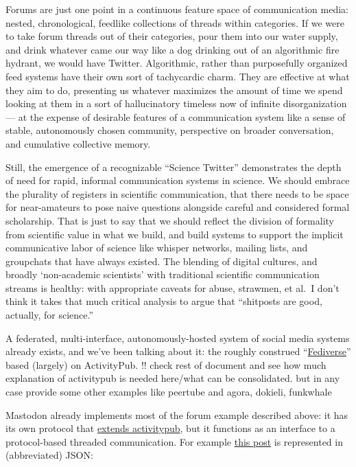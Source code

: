 \documentclass[10pt]{tufte-book}
\begin{document}
Forums are just one point in a continuous feature space of communication
media: nested, chronological, feedlike collections of threads within
categories. If we were to take forum threads out of their categories,
pour them into our water supply, and drink whatever came our way like a
dog drinking out of an algorithmic fire hydrant, we would have Twitter.
Algorithmic, rather than purposefully organized feed systems have their
own sort of tachycardic charm. They are effective at what they aim to
do, presenting us whatever maximizes the amount of time we spend looking
at them in a sort of hallucinatory timeless now of infinite
disorganization --- at the expense of desirable features of a
communication system like a sense of stable, autonomously chosen
community, perspective on broader conversation, and cumulative
collective memory.

Still, the emergence of a recognizable ``Science Twitter'' demonstrates
the depth of need for rapid, informal communication systems in science.
We should embrace the plurality of registers in scientific
communication, that there needs to be space for near-amateurs to pose
naive questions alongside careful and considered formal scholarship.
That is just to say that we should reflect the division of formality
from scientific value in what we build, and build systems to support the
implicit communicative labor of science like whisper networks, mailing
lists, and groupchats that have always existed. The blending of digital
cultures, and broadly `non-academic scientists' with traditional
scientific communication streams is healthy: with appropriate caveats
for abuse, strawmen, et al.~I don't think it takes that much critical
analysis to argue that ``shitposts are good, actually, for science.''

A federated, multi-interface, autonomously-hosted system of social media
systems already exists, and we've been talking about it: the roughly
construed ``\href{https://fediverse.party/}{Fediverse}'' based (largely)
on ActivityPub. {!! check rest of document and see how much explanation
of activitypub is needed here/what can be consolidated. but in any case
provide some other examples like peertube and agora, dokieli, funkwhale}

Mastodon already implements most of the forum example described above:
it has its own protocol that
\href{https://docs.joinmastodon.org/spec/activitypub/}{extends
activitypub}, but it functions as an interface to a protocol-based
threaded communication. For example
\href{https://social.coop/@jonny/107328829457619549}{this post} is
represented in (abbreviated) JSON:
\end{document}
